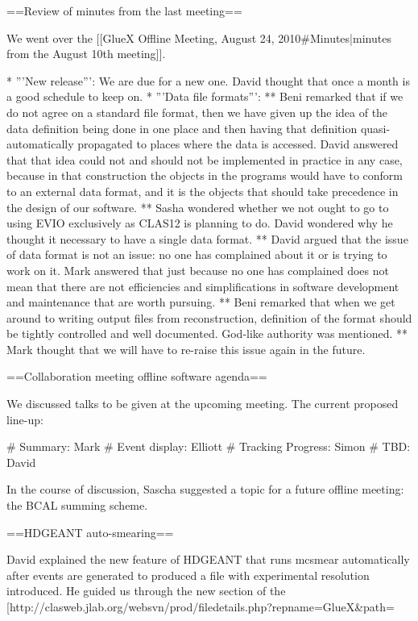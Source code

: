==Review of minutes from the last meeting==

We went over the [[GlueX Offline Meeting, August 24, 2010#Minutes|minutes from the August 10th meeting]].

* '''New release''': We are due for a new one. David thought that once a month is a good schedule to keep on.
* '''Data file formats''':
** Beni remarked that if we do not agree on a standard file format, then we have given up the idea of the data definition being done in one place and then having that definition quasi-automatically propagated to places where the data is accessed. David answered that that idea could not and should not be implemented in practice in any case, because in that construction the objects in the programs would have to conform to an external data format, and it is the objects that should take precedence in the design of our software.
** Sasha wondered whether we not ought to go to using EVIO exclusively as CLAS12 is planning to do. David wondered why he thought it necessary to have a single data format.
** David argued that the issue of data format is not an issue: no one has complained about it or is trying to work on it. Mark answered that just because no one has complained does not mean that there are not efficiencies and simplifications in software development and maintenance that are worth pursuing.
** Beni remarked that when we get around to writing output files from reconstruction, definition of the format should be tightly controlled and well documented. God-like authority was mentioned.
** Mark thought that we will have to re-raise this issue again in the future.

==Collaboration meeting offline software agenda==

We discussed talks to be given at the upcoming meeting. The current proposed line-up:

# Summary: Mark
# Event display: Elliott
# Tracking Progress: Simon
# TBD: David

In the course of discussion, Sascha suggested a topic for a future offline meeting: the BCAL summing scheme.

==HDGEANT auto-smearing==

David explained the new feature of HDGEANT that runs mcsmear automatically after events are generated to produced a file with experimental resolution introduced. He guided us through the new section of the [http://clasweb.jlab.org/websvn/prod/filedetails.php?repname=GlueX&path=%


